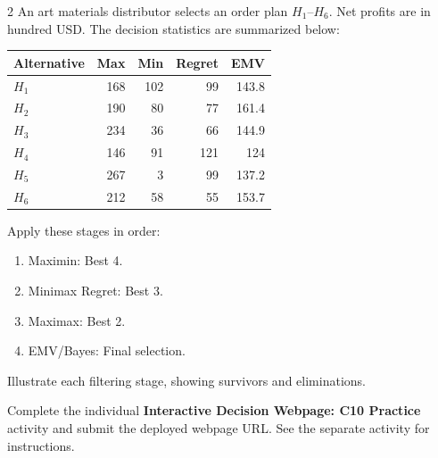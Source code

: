 \begin{multicols}{2}
\columnbreak
{}
An art materials distributor selects an order plan $H_1$--$H_6$. Net profits are in hundred USD. The decision statistics are summarized below:
\vspace{-3mm}
\begin{center}\small\setlength{\tabcolsep}{4pt}
	\begin{tabular}{lrrrr}\toprule
		Alternative & Max & Min & Regret & EMV\\ \midrule
		$H_1$ & 168 & 102 & 99 & 143.8\\
		$H_2$ & 190 & 80 & 77 & 161.4\\
		$H_3$ & 234 & 36 & 66 & 144.9\\
		$H_4$ & 146 & 91 & 121 & 124\\
		$H_5$ & 267 & 3 & 99 & 137.2\\
		$H_6$ & 212 & 58 & 55 & 153.7\\
		\bottomrule
	\end{tabular}
\end{center}
\vspace{-3mm}
Apply these stages in order:
\begin{enumerate}[leftmargin=*]
	\item Maximin: Best 4.
	\item Minimax Regret: Best 3.
	\item Maximax: Best 2.
	\item EMV/Bayes: Final selection.
\end{enumerate}
Illustrate each filtering stage, showing survivors and eliminations.

\par
{}
		Complete the individual \textbf{Interactive Decision Webpage: C10 Practice} activity and submit the deployed webpage URL. See the separate activity for instructions.
		
	\end{multicols}

